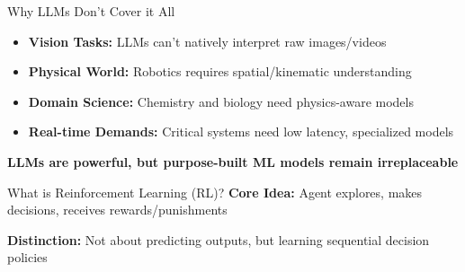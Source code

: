 \documentclass[aspectratio=169]{beamer}
\begin{document}
\begin{frame}{Why LLMs Don't Cover it All}
  \begin{itemize}
    \item \textbf{Vision Tasks:} LLMs can't natively interpret raw images/videos
    \item \textbf{Physical World:} Robotics requires
      spatial/kinematic understanding
    \item \textbf{Domain Science:} Chemistry and biology need
      physics-aware models
    \item \textbf{Real-time Demands:} Critical systems need low
      latency, specialized models
  \end{itemize}

  \vspace{0.5cm}
  \centering
  \textbf{LLMs are powerful, but purpose-built ML models remain irreplaceable}
\end{frame}

\begin{frame}{What is Reinforcement Learning (RL)?}
  \textbf{Core Idea:} Agent explores, makes decisions, receives
  rewards/punishments

  \vspace{0.5cm}
  \begin{center}
  \end{center}

  \vspace{0.5cm}
  \textbf{Distinction:} Not about predicting outputs, but learning
  sequential decision policies
\end{frame}
\end{document}
